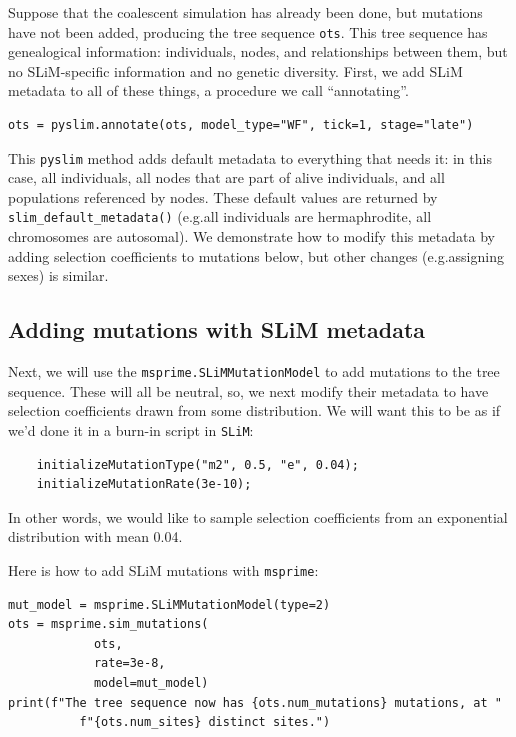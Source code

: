 \documentclass[12pt]{article}
\newcommand{\msprime}[0]{\texttt{msprime}\xspace}
\newcommand{\slim}[0]{\texttt{SLiM}\xspace}
\newcommand{\pyslim}[0]{\texttt{pyslim}\xspace}
\newcommand*{\eg}{e.g.\xcomma}
\begin{document}
Suppose that the coalescent simulation has already been done,
but mutations have not been added,
producing the tree sequence \verb|ots|.
This tree sequence has genealogical information:
individuals, nodes, and relationships between them,
but no SLiM-specific information and no genetic diversity.
First, we add SLiM metadata to all of these things, a procedure we call ``annotating''.
\begin{verbatim}
ots = pyslim.annotate(ots, model_type="WF", tick=1, stage="late")
\end{verbatim}

This \pyslim method adds default metadata to everything that needs it:
in this case, all individuals, all nodes that are part of alive individuals,
and all populations referenced by nodes.
These default values are returned by \verb|slim_default_metadata()|
(\eg all individuals are hermaphrodite, all chromosomes are autosomal).
We demonstrate how to modify this metadata by adding selection coefficients to mutations below,
but other changes (\eg assigning sexes) is similar.


\subsection*{Adding mutations with SLiM metadata}

Next, we will use the \verb|msprime.SLiMMutationModel| to add mutations to the tree sequence.
These will all be neutral,
so, we next modify their metadata to have selection coefficients drawn from some distribution.
We will want this to be as if we'd done it in a burn-in script in \slim :
\begin{verbatim}
    initializeMutationType("m2", 0.5, "e", 0.04);
    initializeMutationRate(3e-10);
\end{verbatim}
In other words, we would like to sample selection coefficients
from an exponential distribution with mean 0.04.

Here is how to add SLiM mutations with \msprime :
\begin{verbatim}
mut_model = msprime.SLiMMutationModel(type=2)
ots = msprime.sim_mutations(
            ots,
            rate=3e-8,
            model=mut_model)
print(f"The tree sequence now has {ots.num_mutations} mutations, at "
          f"{ots.num_sites} distinct sites.")
\end{verbatim}
\end{document}
